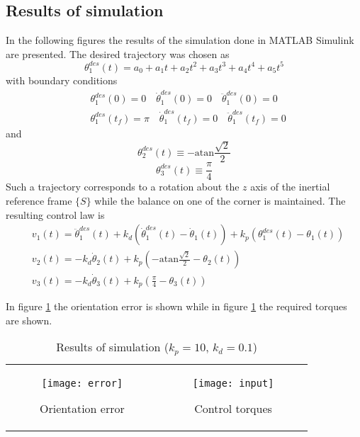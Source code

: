 \subsection{Results of simulation}
In the following figures the results of the simulation done
in MATLAB Simulink are presented.
The desired trajectory was chosen as
\[
\theta_1^{des}(t) = a_0 + a_1 t + a_2 t^2 + a_3 t^3 + a_4 t^4 + a_5 t^5
\]
with boundary conditions
\[
\begin{split}
  &\theta_1^{des}(0) = 0 \quad \dot{\theta}_1^{des}(0)= 0 \quad \ddot{\theta}_1^{des}(0) = 0\\
    &\theta_1^{des}(t_{f}) = \pi \quad \dot{\theta}_1^{des}(t_{f})= 0 \quad \ddot{\theta}_1^{des}(t_{f}) = 0
\end{split}
\]
and
\[
\theta_2^{des}(t) \equiv -\mathrm{atan}\frac{\sqrt{2}}{2}
\]
\[
\theta_3^{des}(t) \equiv \frac{\pi}{4}
\]
Such a trajectory corresponds to a rotation about the $z$ axis of the inertial
reference frame $\{S\}$ while the balance on one of the corner is maintained.
The resulting control law is
\begin{equation}\label{eq:PD_yaw}
  \begin{split}
    &v_1(t) = \ddot{\theta}_1^{des}(t) + k_d(\dot{\theta}_1^{des}(t) - \dot{\theta}_1(t)) + k_p (\theta_1^{des}(t) - \theta_1(t))\\
    &v_2(t) = - k_d\dot{\theta}_2(t) + k_p \left(-\mathrm{atan}\frac{\sqrt{2}}{2} - \theta_2(t)\right)\\
    &v_3(t) = - k_d\dot{\theta}_3(t) + k_p \left(\frac{\pi}{4} - \theta_3(t)\right)
  \end{split}
\end{equation}
\par
In figure \ref{fig:orientation_error} the orientation error is shown while
in figure \ref{fig:requested_torques} the required torques are shown.
\begin{table}[h]
  \begin{tabular}{cc}
    \begin{subfigure}{0.5\textwidth}
      \centering
      \texttt{[image: error]}
      \caption{Orientation error \label{fig:orientation_error}}
    \end{subfigure}&
    \begin{subfigure}{0.5\textwidth}
      \centering
      \texttt{[image: input]}
      \caption{Control torques \label{fig:requested_torques}}
    \end{subfigure}
  \end{tabular}
  \caption{Results of simulation ($k_p = 10$, $k_d = 0.1$)}
\end{table}

